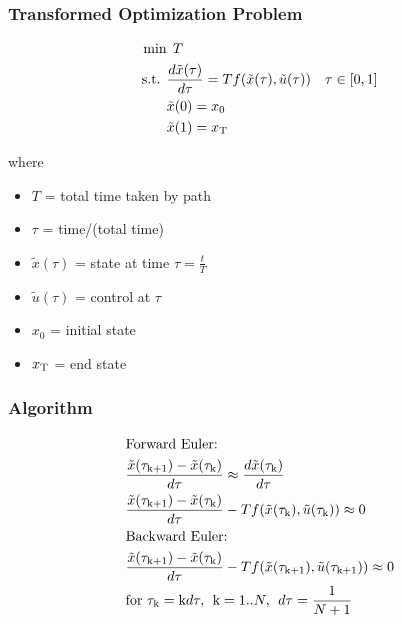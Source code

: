\documentclass{beamer}
\newcommand{\ut}[1]{\ensuremath{\tilde{#1}}}
\begin{document}
\begin{frame}
\frametitle{Transformed Optimization Problem}

\begin{small}
\begin{align*}
\min  & \: \:T \\
\mbox{s.t. } & \frac{d\ut{x}(\tau)}{d\tau} = Tf(\ut{x}(\tau),\ut{u}(\tau))  &\tau \in [0,1] \\
& \ut{x}(0) = x_0 \\
& \ut{x}(1) = x_{\scriptsize\mbox{T}} 
\end{align*}

where
\begin{itemize}
\item $T$ = total time taken by path 
\item $\tau$ = time/(total time)
\item $\ut{x}(\tau)$ = state at time $\tau = \frac{t}{T}$ 
\item $\ut{u}(\tau)$ = control at $\tau$ 
\item $x_0$ = initial state
\item $x_{\scriptsize\mbox{T}}$ = end state
\end{itemize} 

\end{small}

\end{frame}

\begin{frame}
\frametitle{Algorithm}
\begin{small}
\begin{align*}
& \text{Forward Euler:} \\
& \frac{\ut{x}(\tau_{\scriptsize\mbox{k+1}}) -  \ut{x}(\tau_{\scriptsize\mbox{k}})}{d\tau}  
\approx \frac{d\ut{x}(\tau_{\scriptsize\mbox{k}})}{d\tau} \\
& \frac{\ut{x}(\tau_{\scriptsize\mbox{k+1}}) -  \ut{x}(\tau_{\scriptsize\mbox{k}})}{d\tau}  
- Tf(\ut{x}(\tau_{\scriptsize\mbox{k}}),\ut{u}(\tau_{\scriptsize\mbox{k}})) \approx 0 \\
& \text{Backward Euler:} \\
& \frac{\ut{x}(\tau_{\scriptsize\mbox{k+1}}) -  \ut{x}(\tau_{\scriptsize\mbox{k}})}{d\tau}  
 - Tf(\ut{x}(\tau_{\scriptsize\mbox{k+1}}),\ut{u}(\tau_{\scriptsize\mbox{k+1}})) \approx 0 \\
& \text{for } \tau_{\scriptsize\mbox{k}} = \text{k}d\tau,  \:\: \text{k} = 1..N,  \:\: d\tau = \frac{1}{N+1}
\end{align*}
\end{small}

\end{frame}
\end{document}
